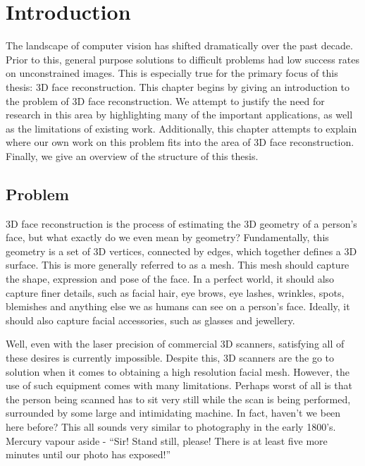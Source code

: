 \graphicspath{{chapter_introduction/}}
\chapter{Introduction}

The landscape of computer vision has shifted dramatically over the
past decade. Prior to this, general purpose solutions to difficult
problems had low success rates on unconstrained images. This is
especially true for the primary focus of this thesis: 3D face
reconstruction. This chapter begins by giving an introduction to the
problem of 3D face reconstruction. We attempt to justify the need for
research in this area by highlighting many of the important
applications, as well as the limitations of existing
work. Additionally, this chapter attempts to explain where our own
work on this problem fits into the area of 3D face
reconstruction. Finally, we give an overview of the structure of this
thesis.

\section{Problem}

3D face reconstruction is the process of estimating the 3D geometry of
a person's face, but what exactly do we even mean by geometry?
Fundamentally, this geometry is a set of 3D vertices, connected by
edges, which together defines a 3D surface. This is more generally
referred to as a mesh. This mesh should capture the shape, expression
and pose of the face. In a perfect world, it should also capture finer
details, such as facial hair, eye brows, eye lashes, wrinkles, spots,
blemishes and anything else we as humans can see on a person's
face. Ideally, it should also capture facial accessories, such as
glasses and jewellery.

Well, even with the laser precision of commercial 3D scanners,
satisfying all of these desires is currently impossible. Despite this,
3D scanners are the go to solution when it comes to obtaining a high
resolution facial mesh. However, the use of such equipment comes with
many limitations. Perhaps worst of all is that the person being
scanned has to sit very still while the scan is being performed,
surrounded by some large and intimidating machine. In fact, haven't we
been here before? This all sounds very similar to photography in the
early 1800's. Mercury vapour aside - ``Sir! Stand still, please! There
is at least five more minutes until our photo has exposed!''

